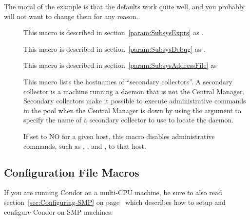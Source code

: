 The moral of the example is that 
the defaults work quite well, and you probably 
will not want to change them for any reason.
\begin{description}

\item[] \label{param:MasterExprs} This macro is
  described in section~\ref{param:SubsysExprs} as
  .

\item[] \label{param:MasterDebug} This macro
  is described in section~\ref{param:SubsysDebug} as
  .

\item[] \label{param:MasterAddressFile}
  This macro is described in
  section~\ref{param:SubsysAddressFile} as

\item[]
  \label{param:SecondaryCollectorList} This macro lists the hostnames
  of ``secondary collectors''.  A secondary collector is a machine
  running a  daemon that is not the Central Manager.
  Secondary collectors make it possible to execute administrative
  commands in the pool when the Central Manager is down by using the
   argument to specify the name of a secondary collector to
  use to locate the  daemon.

\item[]
  \label{param:AllowAdminCommands} If set to NO for a given host, this
  macro disables administrative commands, such as 
  , , and , to that host.

\end{description}

\subsection{\label{sec:Startd-Config-File-Entries}
 Configuration File Macros}

\Note If you are running Condor on a multi-CPU machine, be sure
to also read section~\ref{sec:Configuring-SMP} on
page~\pageref{sec:Configuring-SMP} which describes how to setup and
configure Condor on SMP machines.


